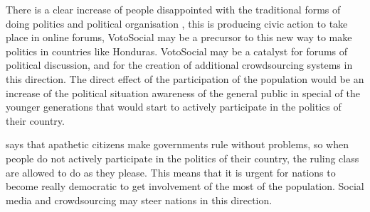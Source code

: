 \documentclass[letterpaper,10pt]{article}
\begin{document}
There is a clear increase of people disappointed with the traditional forms of doing politics and political organisation \citep{milan2013} , this is producing civic action to take place in online forums, VotoSocial may be a precursor to this new way to make politics in countries like Honduras. VotoSocial may be a catalyst for forums of political discussion, and for the creation of additional crowdsourcing systems in this direction. The direct effect of the participation of the population would be an increase of the political situation awareness of the general public in special of the younger generations that would start to actively participate in the politics of their country.

\cite{sartori2003} says that apathetic citizens make governments rule without problems, so when people do not actively participate in the politics of their country, the ruling class are allowed to do as they please. This means that it is urgent for nations to become really democratic to get involvement of the most of the population. Social media and crowdsourcing may steer nations in this direction.



\end{document}
